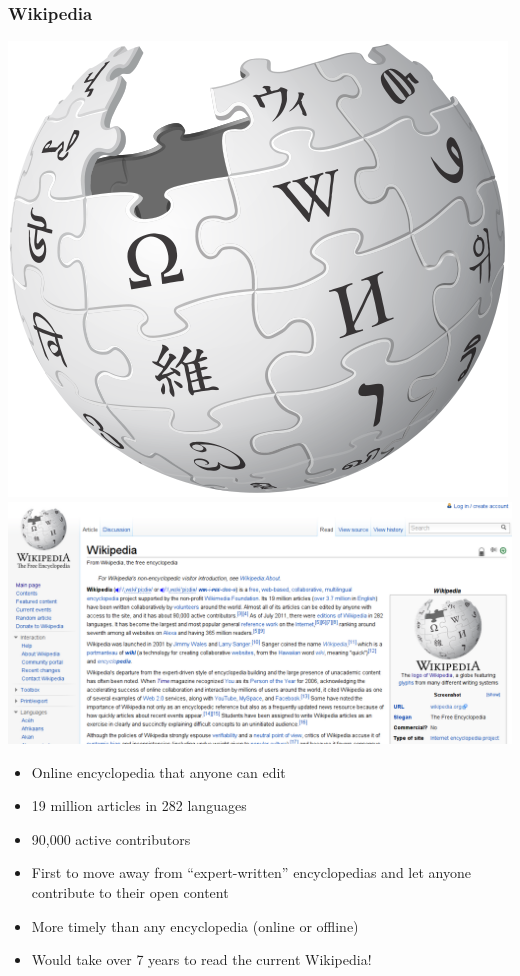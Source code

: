 \documentclass{beamer}
\begin{document}
\begin{frame}
  \frametitle{Wikipedia}
  \begin{center} \includegraphics[height=0.35\textheight]{img/wikipedia}\hspace{1em} \includegraphics[height=0.35\textheight]{img/wikiwiki} \end{center}
  
  \begin{itemize}
  \item Online encyclopedia that anyone can edit
  \item 19 million articles in 282 languages
  \item 90,000 active contributors
  \item First to move away from ``expert-written'' encyclopedias and let anyone contribute to their open content
  \item More timely than any encyclopedia (online or offline)
  \item Would take over 7 years to read the current Wikipedia!
  \end{itemize}
\end{frame}
\end{document}
